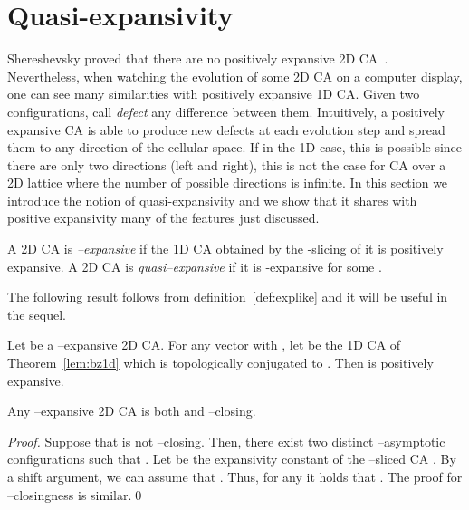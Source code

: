 \documentclass{llncs}
\newcommand{\ignore}[1]{}
\begin{document}
\section{Quasi-expansivity}
Shereshevsky proved that there are no positively expansive 2D CA~\cite{shereshevsky93}. Nevertheless, when watching the evolution of some 2D CA on a computer display, one can see many similarities with positively expansive 1D CA. Given two configurations, call \emph{defect}
any difference between them. Intuitively, a positively expansive CA is able to produce new defects at each evolution step and spread them to any direction of the cellular space. If in the 1D case, this is possible since there are only two directions (left and right), this is not
the case for CA over a 2D lattice where the number of possible directions is infinite.  In this section we introduce the notion of quasi-expansivity and we show that it shares with positive expansivity many
of the features just discussed.
\begin{definition}
\label{def:explike} A 2D CA  is \emph{--expansive} if the
1D CA  obtained by the -slicing of it
is positively expansive. A 2D CA  is \emph{quasi--expansive} if
it is -expansive for some .
\end{definition}
The following result follows from definition~\ref{def:explike} and
it will be useful in the sequel.
\begin{lemma}
\label{lem:nuexpansivef} Let  be a --expansive 2D CA. For
any vector  with , let  be the 1D CA of Theorem~\ref{lem:bz1d} which is
topologically conjugated to .
Then  is positively expansive.
\end{lemma}
\begin{theorem}
\label{th:expclosing} Any --expansive 2D CA is both  and
--closing.
\end{theorem}
\begin{proof}
Suppose that  is not --closing. Then, there exist two
distinct --a\-sym\-pto\-tic configurations  such
that . Let  be the expansivity
constant of the --sliced CA . By a shift argument, we
can assume that . Thus, for
any  it holds that . The proof for --closingness is similar.\qed
\ignore{We show that  is --closing. Fix  with
 and for any integer  denote
. By Lemma~\ref{lem:nuexpansivef}, for any
, the CA  conjugated to  is positively expansive and then, by a well known result
in~\cite{kurka04,nasu95}, it is both right and left closing. Thus, for
any  and for any pair of distinct -asymptotic
configurations  it holds that .
Let  be two distinct -asymptotic
configurations. There exists a sequence  of pairs of distinct -asymptotic
configurations converging to  and such that
. This assures that .
}
\end{proof}
\end{document}
